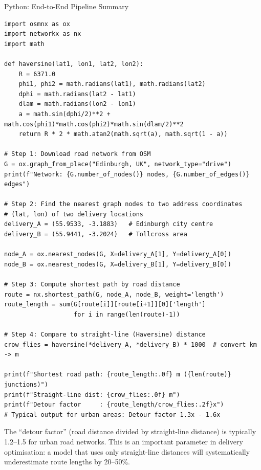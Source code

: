 \documentclass[aspectratio=169,10pt]{beamer}
\begin{document}
\begin{frame}[fragile]{Python: End-to-End Pipeline Summary}

\begin{lstlisting}[caption={Complete pipeline: OSM data to shortest-path result}]
import osmnx as ox
import networkx as nx
import math

def haversine(lat1, lon1, lat2, lon2):
    R = 6371.0
    phi1, phi2 = math.radians(lat1), math.radians(lat2)
    dphi = math.radians(lat2 - lat1)
    dlam = math.radians(lon2 - lon1)
    a = math.sin(dphi/2)**2 + math.cos(phi1)*math.cos(phi2)*math.sin(dlam/2)**2
    return R * 2 * math.atan2(math.sqrt(a), math.sqrt(1 - a))

# Step 1: Download road network from OSM
G = ox.graph_from_place("Edinburgh, UK", network_type="drive")
print(f"Network: {G.number_of_nodes()} nodes, {G.number_of_edges()} edges")

# Step 2: Find the nearest graph nodes to two address coordinates
# (lat, lon) of two delivery locations
delivery_A = (55.9533, -3.1883)   # Edinburgh city centre
delivery_B = (55.9441, -3.2024)   # Tollcross area

node_A = ox.nearest_nodes(G, X=delivery_A[1], Y=delivery_A[0])
node_B = ox.nearest_nodes(G, X=delivery_B[1], Y=delivery_B[0])

# Step 3: Compute shortest path by road distance
route = nx.shortest_path(G, node_A, node_B, weight='length')
route_length = sum(G[route[i]][route[i+1]][0]['length']
                   for i in range(len(route)-1))

# Step 4: Compare to straight-line (Haversine) distance
crow_flies = haversine(*delivery_A, *delivery_B) * 1000  # convert km -> m

print(f"Shortest road path: {route_length:.0f} m ({len(route)} junctions)")
print(f"Straight-line dist: {crow_flies:.0f} m")
print(f"Detour factor     : {route_length/crow_flies:.2f}x")
# Typical output for urban areas: Detour factor 1.3x - 1.6x
\end{lstlisting}

  The ``detour factor'' (road distance divided by straight-line
  distance) is typically 1.2--1.5 for urban road networks.  This is
  an important parameter in delivery optimisation: a model that uses
  only straight-line distances will systematically underestimate
  route lengths by 20--50\%.

\end{frame}
\end{document}
